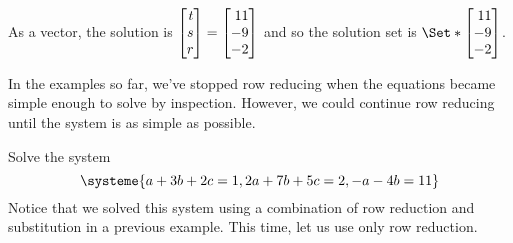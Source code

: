 \begin{example}
		As a vector, the solution is $\mat{t\\s\\r}=\mat{11\\-9\\-2}$ and so the solution set is $\Set*{\mat{11\\-9\\-2}}$.
	\end{example}

	In the examples so far, we've stopped row reducing when the equations became simple enough
	to solve by inspection. However, we could continue row reducing until the system is as simple as possible.

	\begin{example}
		Solve the system
		\[
			\systeme{
				a+3b+2c=1,
				2a+7b+5c=2,
				-a-4b=11
			}
		\]
		Notice that we solved this system using a combination of row reduction and substitution in a previous example.
		This time, let us use only row reduction.
		

\end{example}

